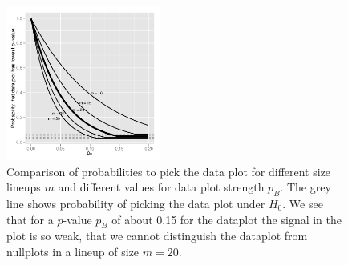 \documentclass[11pt]{article}
\begin{document}
\begin{figure}[htbp] %
   \centering
   \includegraphics[width=2in]{images/powerplot.pdf} 
   \caption{Comparison of probabilities to pick the data plot for different size lineups $m$ and different values for data plot strength $p_B$. The grey line shows probability of picking the data plot under $H_0$. We see that for a $p$-value $p_B$ of about 0.15 for the dataplot the signal in the plot is so weak, that we cannot distinguish the dataplot from nullplots in a lineup of size $m=20$. }
   \label{power}
\end{figure}
%
\end{document}

